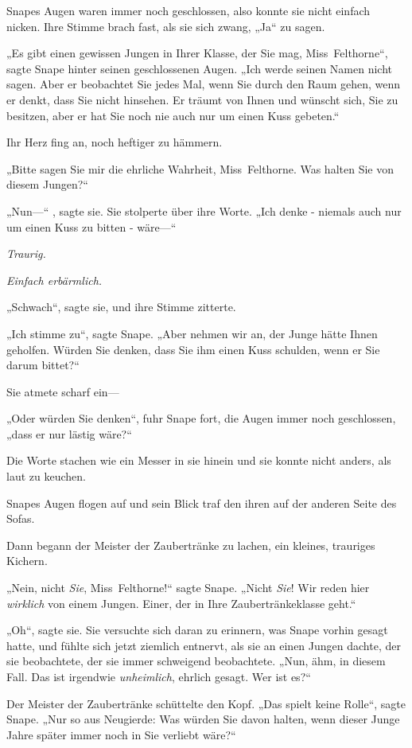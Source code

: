 {Snapes Augen waren immer noch geschlossen, also konnte sie nicht einfach nicken. Ihre Stimme brach fast, als sie sich zwang, „Ja“ zu sagen.

„Es gibt einen gewissen Jungen in Ihrer Klasse, der Sie mag, Miss~Felthorne“, sagte Snape hinter seinen geschlossenen Augen. „Ich werde seinen Namen nicht sagen. Aber er beobachtet Sie jedes Mal, wenn Sie durch den Raum gehen, wenn er denkt, dass Sie nicht hinsehen. Er träumt von Ihnen und wünscht sich, Sie zu besitzen, aber er hat Sie noch nie auch nur um einen Kuss gebeten.“

Ihr Herz fing an, noch heftiger zu hämmern.

„Bitte sagen Sie mir die ehrliche Wahrheit, Miss~Felthorne. Was halten Sie von diesem Jungen?“

„Nun—“ , sagte sie. Sie stolperte über ihre Worte. „Ich denke - niemals auch nur um einen Kuss zu bitten - wäre—“

\emph{Traurig.}

\emph{Einfach erbärmlich.}

„Schwach“, sagte sie, und ihre Stimme zitterte.

„Ich stimme zu“, sagte Snape. „Aber nehmen wir an, der Junge hätte Ihnen geholfen. Würden Sie denken, dass Sie ihm einen Kuss schulden, wenn er Sie darum bittet?“

Sie atmete scharf ein—

„Oder würden Sie denken“, fuhr Snape fort, die Augen immer noch geschlossen, „dass er nur lästig wäre?“

Die Worte stachen wie ein Messer in sie hinein und sie konnte nicht anders, als laut zu keuchen.

Snapes Augen flogen auf und sein Blick traf den ihren auf der anderen Seite des Sofas.

Dann begann der Meister der Zaubertränke zu lachen, ein kleines, trauriges Kichern.

„Nein, nicht \emph{Sie}, Miss~Felthorne!“ sagte Snape. „Nicht \emph{Sie}! Wir reden hier \emph{wirklich} von einem Jungen. Einer, der in Ihre Zaubertränkeklasse geht.“

„Oh“, sagte sie. Sie versuchte sich daran zu erinnern, was Snape vorhin gesagt hatte, und fühlte sich jetzt ziemlich entnervt, als sie an einen Jungen dachte, der sie beobachtete, der sie immer schweigend beobachtete. „Nun, ähm, in diesem Fall. Das ist irgendwie \emph{unheimlich}, ehrlich gesagt. Wer ist es?“

Der Meister der Zaubertränke schüttelte den Kopf. „Das spielt keine Rolle“, sagte Snape. „Nur so aus Neugierde: Was würden Sie davon halten, wenn dieser Junge Jahre später immer noch in Sie verliebt wäre?“

}
